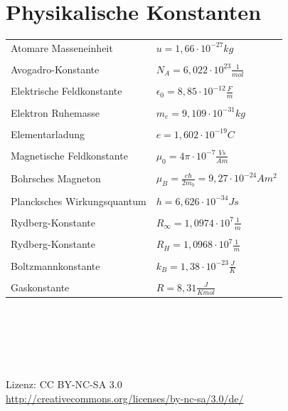 \documentclass[a4paper,twocolumn,10pt]{article}
\begin{document}
\section{Physikalische Konstanten}
\begin{tabular}{ll}
Atomare Masseneinheit & $u=1,66\cdot 10^{-27}kg$\\\\
Avogadro-Konstante & $N_A=6,022\cdot 10^{23}\frac{1}{mol}$\\\\
Elektrische Feldkonstante & $\epsilon_0=8,85\cdot 10^{-12}\frac{F}{m}$\\\\
Elektron Ruhemasse & $m_e=9,109\cdot 10^{-31}kg$\\\\
Elementarladung & $e=1,602\cdot 10^{-19}C$\\\\
Magnetische Feldkonstante & $\mu_0=4\pi\cdot 10^{-7}\frac{Vs}{Am}$\\\\
Bohrsches Magneton & $\mu_B=\frac{e\hbar}{2m_0}=9,27\cdot 10^{-24}Am^2$\\\\
Plancksches Wirkungsquantum & $h=6,626\cdot 10^{-34}Js$\\\\
Rydberg-Konstante & $R_\infty=1,0974\cdot 10^7\frac{1}{m}$\\\\
Rydberg-Konstante & $R_H=1,0968\cdot 10^7\frac{1}{m}$\\\\
Boltzmannkonstante & $k_B=1,38\cdot 10^{-23}\frac{J}{K}$\\\\
Gaskonstante & $R=8,31\frac{J}{Kmol}$
\end{tabular}
\\\\\\\\\\
Lizenz: CC BY-NC-SA 3.0\\
\url{http://creativecommons.org/licenses/by-nc-sa/3.0/de/}
\end{document}
